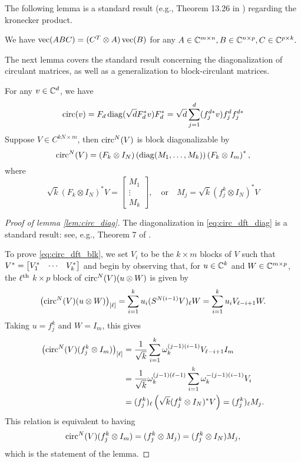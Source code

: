The following lemma is a standard result (e.g., Theorem 13.26 in \cite{laub2004matrix}) regarding the kronecker product.

\begin{lemma}
  We have $\operatorname{vec}(A B C) = (C^T \otimes A) \operatorname{vec}(B)$ for any $A \in \mathbb{C}^{m \times n}, B \in \mathbb{C}^{n \times p}, C \in \mathbb{C}^{p \times k}.$
  \label{lem:kronvec}
\end{lemma}
The next lemma covers the standard result concerning the diagonalization of circulant matrices, as well as a generalization to block-circulant matrices.
\begin{lemma}
  For any $v \in \mathbb{C}^d$, we have \begin{equation} \operatorname{circ}(v) = F_d \operatorname{diag}(\sqrt{d} F_d^* v) F_d^* = \sqrt{d} \sum_{j = 1}^d (f_j^{d *} v) f_j^d f_j^{d *} \label{eq:circ_dft_diag} \end{equation}
  Suppose $V \in C^{k N \times m}$, then $\operatorname{circ}^N(V)$ is block diagonalizable by \begin{equation} \operatorname{circ}^N(V) = \left(F_k \otimes I_N\right) \left(\operatorname{diag}(M_1, \ldots, M_k)\right) \left(F_k \otimes I_m\right)^*,  \label{eq:circ_dft_blk} \end{equation} where \begin{equation} \sqrt{k}\left(F_k \otimes I_N\right)^* V = \begin{bmatrix} M_1 \\ \vdots \\ M_k \end{bmatrix}, \quad \text{or} \quad M_j = \sqrt{k} (f_j^k \otimes I_N)^* V \label{eq:M_ell}\end{equation} \label{lem:circ_diag}
\end{lemma}

\begin{proof}[Proof of lemma \ref{lem:circ_diag}]
  The diagonalization in \eqref{eq:circ_dft_diag} is a standard result: see, e.g., Theorem 7 of \cite{gray2006circulant}.

  To prove \eqref{eq:circ_dft_blk}, we set $V_i$ to be the $k \times m$ blocks of $V$ such that $V^* = \begin{bmatrix} V^*_{1} & \cdots & V^*_{k} \end{bmatrix}$ and begin by observing that, for $u \in \mathbb{C}^k$ and $W \in \mathbb{C}^{m \times p}$, the $\ell^{\text{th}}$ $k \times p$ block of $\operatorname{circ}^N(V)(u \otimes W)$ is given by \[\left(\operatorname{circ}^N(V)(u \otimes W)\right)_{[\ell]} = \sum_{i = 1}^k u_i (S^{N (i - 1)}V)_\ell W = \sum_{i = 1}^k u_i V_{\ell - i + 1} W.\]  Taking $u = f_j^k$ and $W = I_m$, this gives \begin{align*} \left(\operatorname{circ}^N(V)(f_j^k \otimes I_m)\right)_{[\ell]} &= \frac{1}{\sqrt{k}}\sum_{i = 1}^k \omega_k^{(j - 1) (i - 1)} V_{\ell - i + 1} I_m \\ &= \frac{1}{\sqrt{k}} \omega_k^{(j - 1) (\ell - 1)} \sum_{i = 1}^k \omega_k^{-(j - 1)(i - 1)} V_i \\ &= (f_j^k)_\ell \left(\sqrt{k} (f_j^k \otimes I_N)^* V \right) = (f_j^k)_\ell M_j. \end{align*}  This relation is equivalent to having \[\operatorname{circ}^N(V) (f_j^k \otimes I_m) = (f_j^k \otimes M_j) = (f_j^k \otimes I_N) M_j,\] which is the statement of the lemma.
\end{proof}

